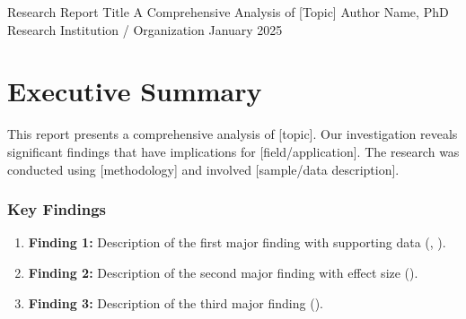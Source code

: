 \documentclass[11pt,letterpaper]{report}
\begin{document}

\makereporttitle
    {Research Report Title}                    %
    {A Comprehensive Analysis of [Topic]}      %
    {Author Name, PhD}                         %
    {Research Institution / Organization}     %
    {January 2025}                             %




\tableofcontents
\newpage

\listoffigures
\newpage

\listoftables
\newpage


\chapter*{Executive Summary}

\begin{executivesummary}
This report presents a comprehensive analysis of [topic]. Our investigation reveals significant findings that have implications for [field/application]. The research was conducted using [methodology] and involved [sample/data description].
\end{executivesummary}

\subsection*{Key Findings}

\begin{keyfindings}
\begin{enumerate}
    \item \textbf{Finding 1:} Description of the first major finding with supporting data (, ).
    \item \textbf{Finding 2:} Description of the second major finding with effect size ().
    \item \textbf{Finding 3:} Description of the third major finding ().
\end{enumerate}
\end{keyfindings}
\end{document}
